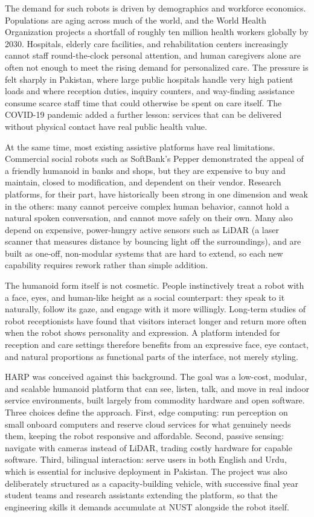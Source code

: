 \documentclass[11pt,a4paper]{article}
\begin{document}
The demand for such robots is driven by demographics and workforce economics. Populations are aging across much of the world, and the World Health Organization projects a shortfall of roughly ten million health workers globally by 2030. Hospitals, elderly care facilities, and rehabilitation centers increasingly cannot staff round-the-clock personal attention, and human caregivers alone are often not enough to meet the rising demand for personalized care. The pressure is felt sharply in Pakistan, where large public hospitals handle very high patient loads and where reception duties, inquiry counters, and way-finding assistance consume scarce staff time that could otherwise be spent on care itself. The COVID-19 pandemic added a further lesson: services that can be delivered without physical contact have real public health value.

At the same time, most existing assistive platforms have real limitations. Commercial social robots such as SoftBank's Pepper demonstrated the appeal of a friendly humanoid in banks and shops, but they are expensive to buy and maintain, closed to modification, and dependent on their vendor. Research platforms, for their part, have historically been strong in one dimension and weak in the others: many cannot perceive complex human behavior, cannot hold a natural spoken conversation, and cannot move safely on their own. Many also depend on expensive, power-hungry active sensors such as LiDAR (a laser scanner that measures distance by bouncing light off the surroundings), and are built as one-off, non-modular systems that are hard to extend, so each new capability requires rework rather than simple addition.

The humanoid form itself is not cosmetic. People instinctively treat a robot with a face, eyes, and human-like height as a social counterpart: they speak to it naturally, follow its gaze, and engage with it more willingly. Long-term studies of robot receptionists have found that visitors interact longer and return more often when the robot shows personality and expression. A platform intended for reception and care settings therefore benefits from an expressive face, eye contact, and natural proportions as functional parts of the interface, not merely styling.

HARP was conceived against this background. The goal was a low-cost, modular, and scalable humanoid platform that can see, listen, talk, and move in real indoor service environments, built largely from commodity hardware and open software. Three choices define the approach. First, edge computing: run perception on small onboard computers and reserve cloud services for what genuinely needs them, keeping the robot responsive and affordable. Second, passive sensing: navigate with cameras instead of LiDAR, trading costly hardware for capable software. Third, bilingual interaction: serve users in both English and Urdu, which is essential for inclusive deployment in Pakistan. The project was also deliberately structured as a capacity-building vehicle, with successive final year student teams and research assistants extending the platform, so that the engineering skills it demands accumulate at NUST alongside the robot itself.
\end{document}
